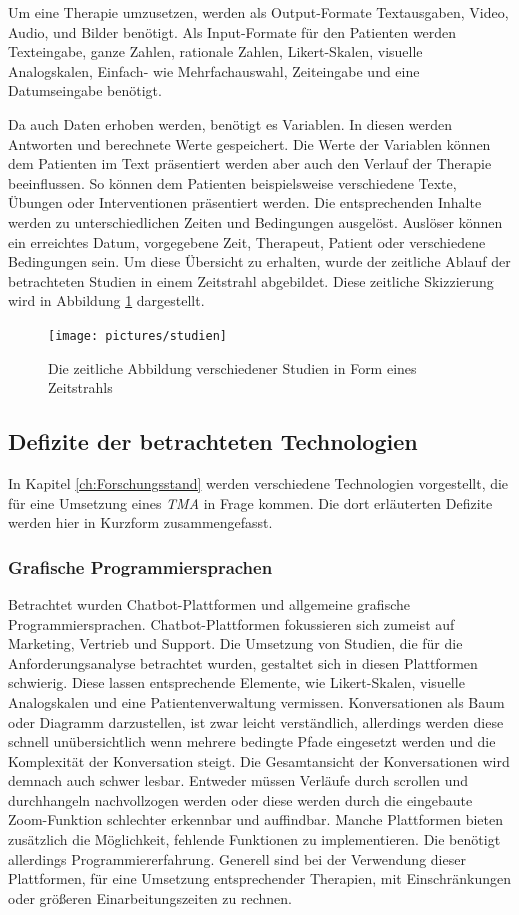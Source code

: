 Um eine Therapie umzusetzen, werden als Output-Formate Textausgaben, Video, Audio, und Bilder benötigt. Als Input-Formate für den Patienten werden Texteingabe, ganze Zahlen, rationale Zahlen, Likert-Skalen, visuelle Analogskalen, Einfach- wie Mehrfachauswahl, Zeiteingabe und eine Datumseingabe benötigt. 
 
Da auch Daten erhoben werden, benötigt es Variablen. In diesen werden Antworten und berechnete Werte gespeichert. Die Werte der Variablen können dem Patienten im Text präsentiert werden aber auch den Verlauf der Therapie beeinflussen. So können dem Patienten beispielsweise verschiedene Texte, Übungen oder Interventionen präsentiert werden. Die entsprechenden Inhalte werden zu unterschiedlichen Zeiten und Bedingungen ausgelöst. Auslöser können ein erreichtes Datum, vorgegebene Zeit, Therapeut, Patient oder verschiedene Bedingungen sein. Um diese Übersicht zu erhalten, wurde der zeitliche Ablauf der betrachteten Studien in einem Zeitstrahl abgebildet. Diese zeitliche Skizzierung wird in Abbildung \ref{studien} dargestellt.

\begin{figure}[h]
\centering
\texttt{[image: pictures/studien]}
\caption{Die zeitliche Abbildung verschiedener Studien in Form eines Zeitstrahls}
\label{studien}
\end{figure}

\subsection{Defizite der betrachteten Technologien}
In Kapitel \ref{ch:Forschungsstand} werden verschiedene Technologien vorgestellt, die für eine Umsetzung eines \emph{TMA} in Frage kommen. Die dort erläuterten Defizite werden hier in Kurzform zusammengefasst.

\subsubsection{Grafische Programmiersprachen}
Betrachtet wurden Chatbot-Plattformen und allgemeine grafische Programmiersprachen. Chatbot-Plattformen fokussieren sich zumeist auf Marketing, Vertrieb und Support. Die Umsetzung von Studien, die für die Anforderungsanalyse betrachtet wurden, gestaltet sich in diesen Plattformen schwierig. Diese lassen entsprechende Elemente, wie Likert-Skalen, visuelle Analogskalen und eine Patientenverwaltung vermissen. Konversationen als Baum oder Diagramm darzustellen, ist zwar leicht verständlich, allerdings werden diese schnell unübersichtlich wenn mehrere bedingte Pfade eingesetzt werden und die Komplexität der Konversation steigt. Die Gesamtansicht der Konversationen wird demnach auch schwer lesbar. Entweder müssen Verläufe durch scrollen und durchhangeln nachvollzogen werden oder diese werden durch die eingebaute Zoom-Funktion schlechter erkennbar und auffindbar. Manche Plattformen bieten zusätzlich die Möglichkeit, fehlende Funktionen zu implementieren. Die benötigt allerdings Programmiererfahrung. Generell sind bei der Verwendung dieser Plattformen, für eine Umsetzung entsprechender Therapien, mit Einschränkungen oder größeren Einarbeitungszeiten zu rechnen.

